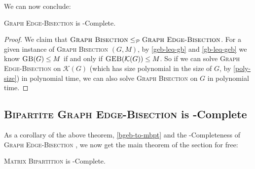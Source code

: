 \documentclass{article}
\newcommand{\mbpt}{\textsc{Matrix \allowbreak Bipartition} }
\newcommand{\gb}{\textsc{Graph \allowbreak Bisection} }
\newcommand{\geb}{\textsc{Graph \allowbreak Edge-\allowbreak Bisection} }
\newcommand{\bgeb}{
	\textsc{Bipartite \allowbreak Graph \allowbreak Edge-\allowbreak Bisection}
 }
\newcommand{\sgeb}{\textsc{GEB} }
\newcommand{\sgb}{\textsc{GB} }
\begin{document}
	We can now conclude:

	\begin{theorem}
		\geb is \NP-Complete.
	\end{theorem}
	\begin{proof}
		We claim that $\gb \leq_{\mathcal{P}} \geb$.
		For a given instance of \gb $(G, M)$, by \autoref{geb-leq-gb} and
		\autoref{gb-leq-geb} we know
		$\sgb(G) \leq M$ if and only if $\sgeb(\mathcal{K}(G)) \leq M$. So
		if we can solve \geb on $\mathcal{K}(G)$ (which has size polynomial
		in the size of $G$, by \autoref{poly-size}) in polynomial time, we can
		also solve \gb on $G$ in polynomial time.
	\end{proof}

	\subsection{\bgeb is \NP-Complete}
	\todo{Prove title}

	As a corollary of the above theorem, \ref{bgeb-to-mbpt} and the
	\NP-Completeness of \geb, we now get the main theorem of the section
	for free:

	\begin{theorem}
		\mbpt is \NP-Complete.
	\end{theorem}
	
\end{document}
